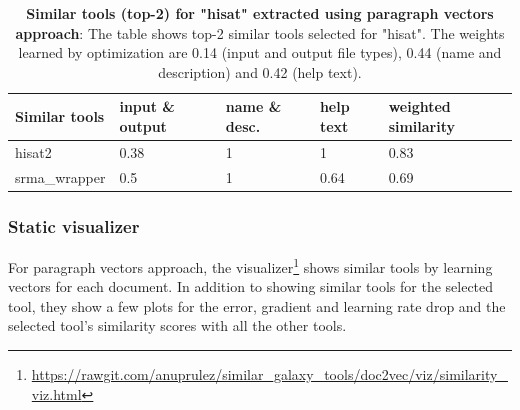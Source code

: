 \begin{table}[ht]
\begin{center}
    \begin{tabular}{|l|l|l|l|l|}
        \hline
        Similar tools   & input \& output & name \& desc. & help text & weighted similarity \\ \hline
        hisat2   & 0.38 & 1 & 1 & 0.83 \\ \hline
        srma\_wrapper & 0.5 & 1 & 0.64 & 0.69 \\ \hline
    \end{tabular}
    \end{center}
    \caption[Similar tools (top-2) for "hisat" extracted using paragraph vectors approach]{\textbf{Similar tools (top-2) for "hisat" extracted using paragraph vectors approach}: The table shows top-2 similar tools selected for "hisat". The weights learned by optimization are 0.14 (input and output file types), 0.44 (name and description) and 0.42 (help text).}
    \label{tab:accuracy}
\end{table}

\subsubsection{Static visualizer}
For paragraph vectors approach, the visualizer\footnote{\url{https://rawgit.com/anuprulez/similar_galaxy_tools/doc2vec/viz/similarity_viz.html}} shows similar tools by learning vectors for each document. In addition to showing similar tools for the selected tool, they show a few plots for the error, gradient and learning rate drop and the selected tool's similarity scores with all the other tools.